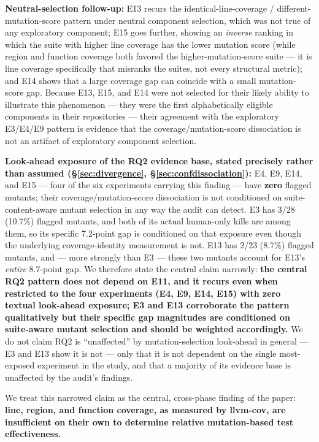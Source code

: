 \documentclass[10pt,conference]{IEEEtran}
\begin{document}
\textbf{Neutral-selection follow-up:} E13 recurs the identical-line-coverage / different-mutation-score pattern under neutral component selection, which was not true of any exploratory component; E15 goes further, showing an \emph{inverse} ranking in which the suite with higher line coverage has the lower mutation score (while region and function coverage both favored the higher-mutation-score suite — it is line coverage specifically that misranks the suites, not every structural metric); and E14 shows that a large coverage gap can coincide with a small mutation-score gap. Because E13, E15, and E14 were not selected for their likely ability to illustrate this phenomenon — they were the first alphabetically eligible components in their repositories — their agreement with the exploratory E3/E4/E9 pattern is evidence that the coverage/mutation-score dissociation is not an artifact of exploratory component selection.

\textbf{Look-ahead exposure of the RQ2 evidence base, stated precisely rather than assumed (\S\ref{sec:divergence}, \S\ref{sec:confdissociation}):} E4, E9, E14, and E15 — four of the six experiments carrying this finding — have \textbf{zero} flagged mutants; their coverage/mutation-score dissociation is not conditioned on suite-content-aware mutant selection in any way the audit can detect. E3 has 3/28 (10.7\%) flagged mutants, and both of its actual human-only kills are among them, so its specific 7.2-point gap is conditioned on that exposure even though the underlying coverage-identity measurement is not. E13 has 2/23 (8.7\%) flagged mutants, and — more strongly than E3 — these two mutants account for E13's \emph{entire} 8.7-point gap. We therefore state the central claim narrowly: \textbf{the central RQ2 pattern does not depend on E11, and it recurs even when restricted to the four experiments (E4, E9, E14, E15) with zero textual look-ahead exposure; E3 and E13 corroborate the pattern qualitatively but their specific gap magnitudes are conditioned on suite-aware mutant selection and should be weighted accordingly.} We do not claim RQ2 is ``unaffected'' by mutation-selection look-ahead in general — E3 and E13 show it is not — only that it is not dependent on the single most-exposed experiment in the study, and that a majority of its evidence base is unaffected by the audit's findings.

We treat this narrowed claim as the central, cross-phase finding of the paper: \textbf{line, region, and function coverage, as measured by llvm-cov, are insufficient on their own to determine relative mutation-based test effectiveness.}
\end{document}
